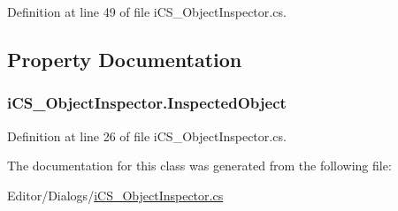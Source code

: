 Definition at line 49 of file i\+C\+S\+\_\+\+Object\+Inspector.\+cs.



\subsection{Property Documentation}
\hypertarget{classi_c_s___object_inspector_a0a3c2fffa4010236494b8737c780d81c}{
\subsubsection[{Inspected\+Object}]{ i\+C\+S\+\_\+\+Object\+Inspector.\+Inspected\+Object\hspace{0.3cm}{\ttfamily [get]}}}\label{classi_c_s___object_inspector_a0a3c2fffa4010236494b8737c780d81c}


Definition at line 26 of file i\+C\+S\+\_\+\+Object\+Inspector.\+cs.



The documentation for this class was generated from the following file\+:\begin{DoxyCompactItemize}
\item 
Editor/\+Dialogs/\hyperlink{i_c_s___object_inspector_8cs}{i\+C\+S\+\_\+\+Object\+Inspector.\+cs}\end{DoxyCompactItemize}
